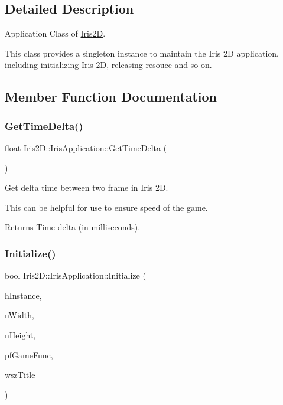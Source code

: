 \subsection{Detailed Description}
Application Class of \hyperlink{namespace_iris2_d}{Iris2D}. 

This class provides a singleton instance to maintain the Iris 2D application, including initializing Iris 2D, releasing resouce and so on. 

\subsection{Member Function Documentation}
\mbox{\label{class_iris2_d_1_1_iris_application_a3b8f4de1902aeda08acbe243aad34f15}} 
\subsubsection{\texorpdfstring{Get\+Time\+Delta()}{GetTimeDelta()}}
{\footnotesize\ttfamily float Iris2\+D\+::\+Iris\+Application\+::\+Get\+Time\+Delta (\begin{DoxyParamCaption}{ }\end{DoxyParamCaption})}



Get delta time between two frame in Iris 2D. 

This can be helpful for use to ensure speed of the game. \begin{DoxyReturn}{Returns}
Time delta (in milliseconds). 
\end{DoxyReturn}
\mbox{\label{class_iris2_d_1_1_iris_application_a84f3ddebb3a3ffb0c172bd41fb952e1a}} 
\subsubsection{\texorpdfstring{Initialize()}{Initialize()}\hspace{0.1cm}{\footnotesize\ttfamily [1/2]}}
{\footnotesize\ttfamily bool Iris2\+D\+::\+Iris\+Application\+::\+Initialize (\begin{DoxyParamCaption}\item[{H\+I\+N\+S\+T\+A\+N\+CE}]{h\+Instance,  }\item[{unsigned int}]{n\+Width,  }\item[{unsigned int}]{n\+Height,  }\item[{\hyperlink{class_iris2_d_1_1_iris_application_ac74720e6cd3a1968f73e92ea99675884}{Game\+Func}}]{pf\+Game\+Func,  }\item[{const std\+::wstring \&}]{wsz\+Title }\end{DoxyParamCaption})}



